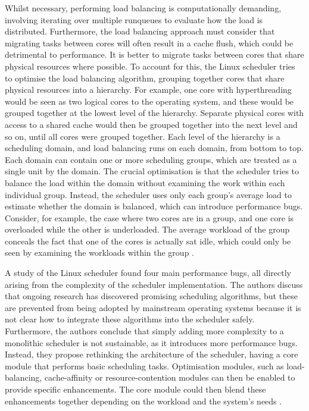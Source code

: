 \documentclass[bsc,frontabs,singlespacing,parskip,deptreport]{infthesis}
\begin{document}
Whilst necessary, performing load balancing is computationally demanding, involving iterating over multiple runqueues to evaluate how the load is distributed. Furthermore, the load balancing approach must consider that migrating tasks between cores will often result in a cache flush, which could be detrimental to performance. It is better to migrate tasks between cores that share physical resources where possible. To account for this, the Linux scheduler tries to optimise the load balancing algorithm, grouping together cores that share physical resources into a hierarchy. For example, one core with hyperthreading would be seen as two logical cores to the operating system, and these would be grouped together at the lowest level of the hierarchy. Separate physical cores with access to a shared cache would then be grouped together into the next level and so on, until all cores were grouped together. Each level of the hierarchy is a scheduling domain, and load balancing runs on each domain, from bottom to top. Each domain can contain one or more scheduling groups, which are treated as a single unit by the domain. The crucial optimisation is that the scheduler tries to balance the load within the domain without examining the work within each individual group. Instead, the scheduler uses only each group's average load to estimate whether the domain is balanced, which can introduce performance bugs. Consider, for example, the case where two cores are in a group, and one core is overloaded while the other is underloaded. The average workload of the group conceals the fact that one of the cores is actually sat idle, which could only be seen by examining the workloads within the group \cite{wasted-cores}.

A study of the Linux scheduler found four main performance bugs, all directly arising from the complexity of the scheduler implementation. The authors discuss that ongoing research has discovered promising scheduling algorithms, but these are prevented from being adopted by mainstream operating systems because it is not clear how to integrate these algorithms into the scheduler safely. Furthermore, the authors conclude that simply adding more complexity to a monolithic scheduler is not sustainable, as it introduces more performance bugs. Instead, they propose rethinking the architecture of the scheduler, having a core module that performs basic scheduling tasks. Optimisation modules, such as load-balancing, cache-affinity or resource-contention modules can then be enabled to provide specific enhancements. The core module could then blend these enhancements together depending on the workload and the system's needs \cite{wasted-cores}.
\end{document}
